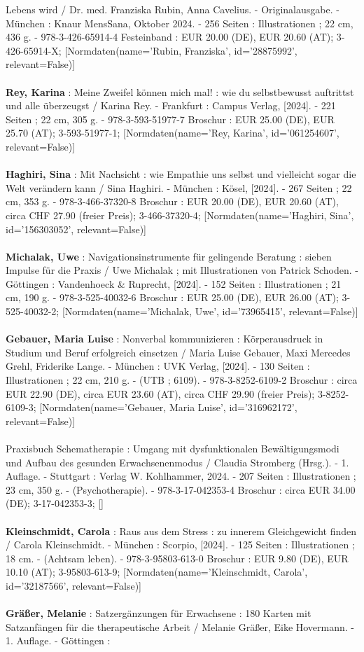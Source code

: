 \documentclass{article}
\begin{document}
\begin{multicols}{3}
Lebens wird / Dr. med. Franziska Rubin, Anna Cavelius. - Originalausgabe. - München : Knaur MensSana, Oktober 2024. - 256 Seiten : Illustrationen ; 22 cm, 436 g. - 978-3-426-65914-4 Festeinband : EUR 20.00 (DE), EUR 20.60 (AT); 3-426-65914-X; [Normdaten(name='Rubin, Franziska', id='28875992', relevant=False)]\\\\\textbf{Rey, Karina} : Meine Zweifel können mich mal! : wie du selbstbewusst auftrittst und alle überzeugst / Karina Rey. - Frankfurt : Campus Verlag, [2024]. - 221 Seiten ; 22 cm, 305 g. - 978-3-593-51977-7 Broschur : EUR 25.00 (DE), EUR 25.70 (AT); 3-593-51977-1; [Normdaten(name='Rey, Karina', id='061254607', relevant=False)]\\\\\textbf{Haghiri, Sina} : Mit Nachsicht : wie Empathie uns selbst und vielleicht sogar die Welt verändern kann / Sina Haghiri. - München : Kösel, [2024]. - 267 Seiten ; 22 cm, 353 g. - 978-3-466-37320-8 Broschur : EUR 20.00 (DE), EUR 20.60 (AT), circa CHF 27.90 (freier Preis); 3-466-37320-4; [Normdaten(name='Haghiri, Sina', id='156303052', relevant=False)]\\\\\textbf{Michalak, Uwe} : Navigationsinstrumente für gelingende Beratung : sieben Impulse für die Praxis / Uwe Michalak ; mit Illustrationen von Patrick Schoden. - Göttingen : Vandenhoeck \& Ruprecht, [2024]. - 152 Seiten : Illustrationen ; 21 cm, 190 g. - 978-3-525-40032-6 Broschur : EUR 25.00 (DE), EUR 26.00 (AT); 3-525-40032-2; [Normdaten(name='Michalak, Uwe', id='73965415', relevant=False)]\\\\\textbf{Gebauer, Maria Luise} : Nonverbal kommunizieren : Körperausdruck in Studium und Beruf erfolgreich einsetzen / Maria Luise Gebauer, Maxi Mercedes Grehl, Friderike Lange. - München : UVK Verlag, [2024]. - 130 Seiten : Illustrationen ; 22 cm, 210 g. - (UTB ; 6109). - 978-3-8252-6109-2 Broschur : circa EUR 22.90 (DE), circa EUR 23.60 (AT), circa CHF 29.90 (freier Preis); 3-8252-6109-3; [Normdaten(name='Gebauer, Maria Luise', id='316962172', relevant=False)]\\\\Praxisbuch Schematherapie : Umgang mit dysfunktionalen Bewältigungsmodi und Aufbau des gesunden Erwachsenenmodus / Claudia Stromberg (Hrsg.). - 1. Auflage. - Stuttgart : Verlag W. Kohlhammer, 2024. - 207 Seiten : Illustrationen ; 23 cm, 350 g. - (Psychotherapie). - 978-3-17-042353-4 Broschur : circa EUR 34.00 (DE); 3-17-042353-3; []\\\\\textbf{Kleinschmidt, Carola} : Raus aus dem Stress : zu innerem Gleichgewicht finden / Carola Kleinschmidt. - München : Scorpio, [2024]. - 125 Seiten : Illustrationen ; 18 cm. - (Achtsam leben). - 978-3-95803-613-0 Broschur : EUR 9.80 (DE), EUR 10.10 (AT); 3-95803-613-9; [Normdaten(name='Kleinschmidt, Carola', id='32187566', relevant=False)]\\\\\textbf{Gräßer, Melanie} : Satzergänzungen für Erwachsene : 180 Karten mit Satzanfängen für die therapeutische Arbeit / Melanie Gräßer, Eike Hovermann. - 1. Auflage. - Göttingen : 
\end{multicols}
\end{document}
